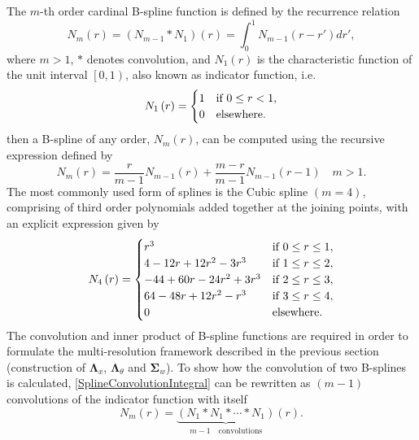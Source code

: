 \documentclass[11pt,draftcls,onecolumn,peerreview]{IEEEtran}
\begin{document}
The $m$-th  order cardinal B-spline function is defined by the recurrence relation \cite{Chui1992} 
\begin{equation}
N_{m}\left(r\right) = \left(N_{m-1}\ast N_{1}\right)\left(r\right) = \int_0^{1} N_{m-1}\left( r-r'\right)dr',
\label{SplineConvolutionIntegral}
\end{equation}
where $m>1$, $\ast$ denotes convolution, and $N_1\left(r\right)$ is the characteristic function of the unit interval $\left[ 0,1\right)$, also known as indicator function, i.e.
\begin{equation}
N_{1}\left(r\right)=
\begin{cases}
1 & \text{if $ 0\le r<1$}, \\
0 & \mathrm{elsewhere}.
\end{cases}
\end{equation}
then a B-spline of any order, $N_m(r)$, can be computed using the recursive expression defined by \cite{DeBoor2001}
\begin{equation}\label{eq:MRA-DoBoorFormula}
 N_{m}\left(r\right)=\frac{r}{m-1}N_{m-1}\left(r\right)+\frac{m-r}{m-1}N_{m-1}\left(r-1\right) \quad m>1.
 \end{equation}
The most commonly used form of splines is the Cubic spline $\left(m=4\right)$, comprising of third order polynomials added together at the joining points, with an explicit expression given by
\begin{align}
N_{4}\left(r\right)=
\begin{cases}
r^3 & \text{if $ 0\le r\le1$}, \\
4-12r+12r^2-3r^3 & \text{if $1\le r\le2$}, \\
-44+60r-24r^2+3r^3 & \text{if $2\le r\le3$}, \\
64-48r+12r^2-r^3 & \text{if $3\le r\le4$}, \\
0 & \mathrm{elsewhere}.
\end{cases}
\end{align}
The convolution and inner product of B-spline functions are required in order to formulate the multi-resolution framework described in the previous section (construction of $\boldsymbol\Lambda_x$, $\boldsymbol\Lambda_{\theta}$ and $\boldsymbol\Sigma_w$). To show how the convolution of two B-splines is calculated, \eqref{SplineConvolutionIntegral} can be rewritten as $(m-1)$ convolutions of the indicator function with itself
\begin{equation}\label{eq:N1convolutions}
 N_{m}\left(r\right)=\underbrace{\left(N_{1}\ast N_{1}\ast \cdots \ast N_{1}\right)}_{m-1\quad \text{convolutions}}\left(r\right).
\end{equation}
\end{document}

